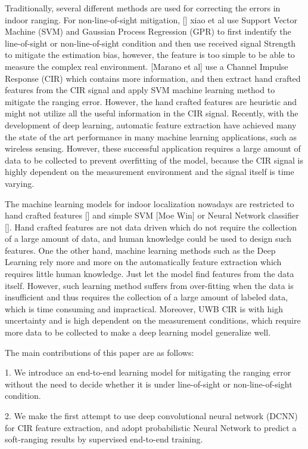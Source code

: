 \documentclass{IEEEtran}
\begin{document}
Traditionally, several different methods are used for correcting the errors in indoor ranging. For non-line-of-sight mitigation, [] xiao et al use Support Vector Machine (SVM) and Gaussian Process Regression (GPR) to first indentify the line-of-sight or non-line-of-sight condition and then use received signal Strength to mitigate the estimation bias, however, the feature is too simple to be able to measure the complex real environment. [Marano et al] use a Channel Impulse Response (CIR) which contains more information, and then extract hand crafted features from the CIR signal and apply SVM machine learning method to mitigate the ranging error. However, the hand crafted features are heuristic and might not utilize all the useful information in the CIR signal. Recently, with the development of deep learning, automatic feature extraction have achieved many the state of the art performance in many machine learning applications, such as wireless sensing. However, these successful application requires a large amount of data to be collected to prevent overfitting of the model, because the CIR signal is highly dependent on the measurement environment and the signal itself is time varying.


The machine learning models for indoor localization nowadays are restricted to hand crafted features [] and simple SVM [Moe Win] or Neural Network classifier []. Hand crafted features are not data driven which do not require the collection of a large amount of data, and human knowledge could be used to design such features. One the other hand, machine learning methods such as the Deep Learning rely more and more on the automatically feature extraction which requires little human knowledge. Just let the model find features from the data itself. However,  such learning method suffers from over-fitting when the data is insufficient and thus requires the collection of a large amount of labeled data, which is time consuming and impractical. Moreover, UWB CIR is with high uncertainty and is high dependent on the measurement conditions, which require more data to be collected to make a deep learning model generalize well.


The main contributions of this paper are as follows:

1.	We introduce an end-to-end learning model for mitigating the ranging error without the need to decide whether it is under line-of-sight or non-line-of-sight condition.

2.	We make the first attempt to use deep convolutional neural network (DCNN) for CIR feature extraction, and adopt probabilistic Neural Network to predict a soft-ranging results by supervised end-to-end training.
\end{document}
